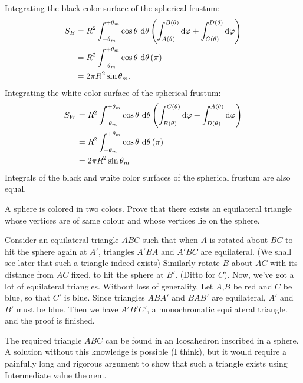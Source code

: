 \documentclass[12pt,a4paper]{memoir}
\theoremstyle{definition}
\begin{document}
\begin{solution}[name={Solution by Yetti}]
	Integrating the black color surface of the spherical frustum:
	\begin{align*}
		S_{B} &= R^2 \int_{ - \theta_m}^{ + \theta_m} \cos \theta\ \text d\theta \left( \int_{A(\theta)}^{B(\theta)} \text d\varphi + \int_{C(\theta)}^{D(\theta)} \text d\varphi \right)\\
		&= R^2 \int_{ - \theta_m}^{ + \theta_m} \cos \theta\ \text d\theta \left( \pi \right)\\
		& = 2 \pi R^2 \sin \theta_m.
	\end{align*}
	Integrating the white color surface of the spherical frustum:
	\begin{align*}
		S_{W} &= R^2 \int_{ - \theta_m}^{ + \theta_m} \cos \theta\ \text d\theta \left( \int_{B(\theta)}^{C(\theta)} \text d\varphi + \int_{D(\theta)}^{A(\theta)} \text d\varphi \right) \\
		&=  R^2 \int_{ - \theta_m}^{ + \theta_m} \cos \theta\ \text d\theta \left( \pi \right)\\
		& = 2 \pi R^2 \sin \theta_m
	\end{align*}
	Integrals of the black and white color surfaces of the spherical frustum are also equal.
\end{solution}





\begin{question}[name={Sphere Coloring by Goutham}]
	A sphere is colored in two colors. Prove that there exists an equilateral triangle whose vertices are of same colour and whose vertices lie on the sphere.
\end{question}





\begin{solution}[name={Solution by Keyree10}] 
	Consider an equilateral triangle $ ABC$ such that when $ A$ is rotated about $ BC$ to hit the sphere again at $ A'$, triangles $ A'BA$ and $ A'BC$ are equilateral. (We shall see later that such a triangle indeed exists)
	Similarly rotate $ B$ about $ AC$ with its distance from $ AC$ fixed, to hit the sphere at $ B'$. (Ditto for $ C$). Now, we've got a lot of equilateral triangles.
	Without loss of generality, Let $ A$,$ B$ be red and $ C$ be blue, so that $ C'$ is blue.
	Since triangles $ ABA'$ and $ BAB'$ are equilateral, $ A'$ and $ B'$ must be blue. Then we have $ A'B'C'$, a monochromatic equilateral triangle. and the proof is finished.
	
	The required triangle $ ABC$ can be found in an Icosahedron inscribed in a sphere. A solution without this knowledge is possible (I think), but it would require a painfully long and rigorous argument to show that such a triangle exists using Intermediate value theorem.
\end{solution}
\end{document}

